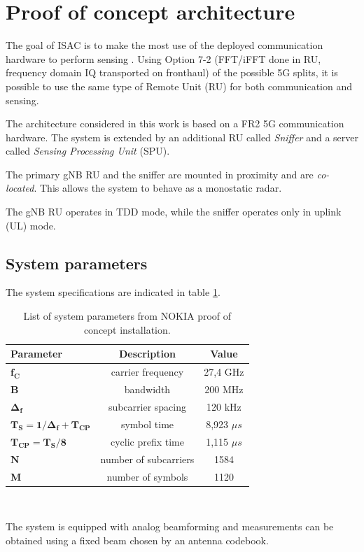 \section{Proof of concept architecture}
\label{sec:intro-PoCarchitecture}

The goal of ISAC is to make the most use of the deployed communication hardware to perform sensing \cite{Wild_Grudnitsky_Mandelli_Henninger_Guan_Schaich_2023}. Using Option 7-2 (FFT/iFFT done in RU, frequency domain IQ transported on fronthaul) of the possible 5G splits, it is possible to use the same type of Remote Unit (RU) for both communication and sensing.

The architecture considered in this work is based on a FR2 5G communication hardware. The system is extended by an additional RU called \textit{Sniffer} and a server called \textit{Sensing Processing Unit} (SPU).

The primary gNB RU and the sniffer are mounted in proximity and are \textit{co-located}. This allows the system to behave as a monostatic radar.

The gNB RU operates in TDD mode, while the sniffer operates only in uplink (UL) mode.

\subsection{System parameters}

The system specifications are indicated in table \ref{table:PoCparams}.

\begin{table}[H]
    \centering 
    \begin{tabular}{|p{9em} c c |}
    \hline
    \rowcolor{bluepoli!40} %
     \textbf{Parameter} & \textbf{Description} & \textbf{Value}  \T\B \\
    \hline \hline
    $\bm{f_C}$ & carrier frequency & 27,4 GHz \T\B \\
    $\bm{B}$ & bandwidth & 200 MHz \T\B\\
    $\bm{\Delta_f}$ & subcarrier spacing & 120 kHz  \T\B\\
    $\bm{T_S = 1/\Delta_f + T_{CP}}$ & symbol time & 8,923 $\mu s$  \T\B\\
    $\bm{T_{CP} = T_S/8}$ & cyclic prefix time & 1,115 $\mu s$  \T\B\\
    $\bm{N}$ & number of subcarriers & 1584  \T\B\\
    $\bm{M}$ & number of symbols & 1120  \B\\

    \hline
    \end{tabular}
    \\[10pt]
    \caption{List of system parameters from NOKIA proof of concept installation.}
    \label{table:PoCparams}
\end{table}

The system is equipped with analog beamforming and measurements can be obtained using a fixed beam chosen by an antenna codebook.
